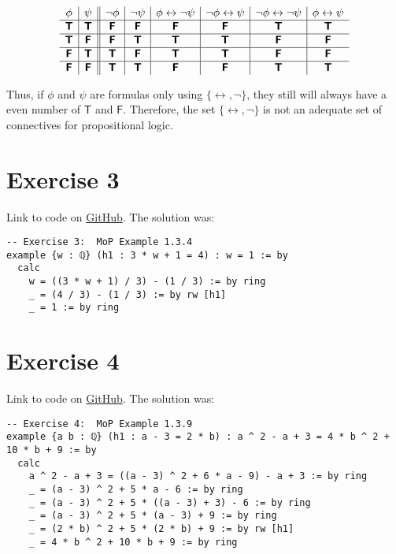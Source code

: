 \documentclass[11pt]{article}
\newcommand{\TTT}{\bm{\mathsf{T}}}
\newcommand{\FFF}{\bm{\mathsf{F}}}
\begin{document}
\[
\begin{array}{c | c || c | c | c | c | c | c}
    \phi & \psi & \neg{\phi} & \neg{\psi} & \phi \leftrightarrow \neg{\psi} & \neg{\phi} \leftrightarrow \psi & \neg{\phi} \leftrightarrow \neg{\psi} & \phi \leftrightarrow \psi \\ \hline
    \TTT & \TTT & \FFF & \FFF & \FFF & \FFF & \TTT & \TTT \\ \hline  
    \TTT & \FFF & \FFF & \TTT & \TTT & \TTT & \FFF & \FFF \\ \hline  
    \FFF & \TTT & \TTT & \FFF & \TTT & \TTT & \FFF & \FFF \\ \hline  
    \FFF & \FFF & \TTT & \TTT & \FFF & \FFF & \TTT & \TTT
\end{array}
\]

Thus, if $\phi$ and $\psi$ are formulas only using $\{\leftrightarrow, \neg\}$, they still will always have a even number of $\TTT$ and $\FFF$. Therefore, the set $\{\leftrightarrow, \neg\}$ is not an adequate set of connectives for propositional logic.

\newpage
\section*{Exercise 3}
Link to code on \href{https://github.com/lucastassis/BU-CS511/blob/main/HW01/code/HW01.lean}{GitHub}. The solution was:

\begin{lstlisting}
-- Exercise 3:  MoP Example 1.3.4
example {w : ℚ} (h1 : 3 * w + 1 = 4) : w = 1 := by
  calc
    w = ((3 * w + 1) / 3) - (1 / 3) := by ring
    _ = (4 / 3) - (1 / 3) := by rw [h1]
    _ = 1 := by ring
\end{lstlisting}

\section*{Exercise 4}
Link to code on \href{https://github.com/lucastassis/BU-CS511/blob/main/HW01/code/HW01.lean}{GitHub}. The solution was: 

\begin{lstlisting}
-- Exercise 4:  MoP Example 1.3.9
example {a b : ℚ} (h1 : a - 3 = 2 * b) : a ^ 2 - a + 3 = 4 * b ^ 2 + 10 * b + 9 := by
  calc
    a ^ 2 - a + 3 = ((a - 3) ^ 2 + 6 * a - 9) - a + 3 := by ring
    _ = (a - 3) ^ 2 + 5 * a - 6 := by ring
    _ = (a - 3) ^ 2 + 5 * ((a - 3) + 3) - 6 := by ring
    _ = (a - 3) ^ 2 + 5 * (a - 3) + 9 := by ring
    _ = (2 * b) ^ 2 + 5 * (2 * b) + 9 := by rw [h1]
    _ = 4 * b ^ 2 + 10 * b + 9 := by ring
\end{lstlisting}
\end{document}

